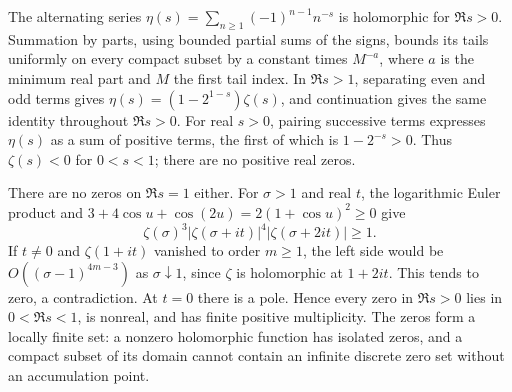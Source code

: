 The alternating series \(\eta(s)=\sum_{n\geq1}(-1)^{n-1}n^{-s}\) is
holomorphic for \(\Re s>0\). Summation by parts, using bounded partial
sums of the signs, bounds its tails uniformly on every compact subset
by a constant times \(M^{-a}\), where \(a\) is the minimum real part and
\(M\) the first tail index. In \(\Re s>1\), separating even and odd terms
gives \(\eta(s)=(1-2^{1-s})\zeta(s)\), and continuation gives the same
identity throughout \(\Re s>0\).
For real \(s>0\), pairing successive terms expresses \(\eta(s)\) as a
sum of positive terms, the first of which is \(1-2^{-s}>0\).
Thus \(\zeta(s)<0\) for \(0<s<1\); there are no positive real zeros.

There are no zeros on \(\Re s=1\) either. For \(\sigma>1\) and real \(t\),
the logarithmic Euler product and
\(3+4\cos u+\cos(2u)=2(1+\cos u)^2\geq0\) give
\[
 \zeta(\sigma)^3|\zeta(\sigma+it)|^4
 |\zeta(\sigma+2it)|\geq1.
\]
If \(t\ne0\) and \(\zeta(1+it)\) vanished to order \(m\geq1\), the left
side would be \(O((\sigma-1)^{4m-3})\) as \(\sigma\downarrow1\), since
\(\zeta\) is holomorphic at \(1+2it\). This tends to zero, a contradiction.
At \(t=0\) there is a pole. Hence every zero in \(\Re s>0\) lies in
\(0<\Re s<1\), is nonreal, and has finite positive multiplicity.
The zeros form a locally finite set: a nonzero holomorphic function has
isolated zeros, and a compact subset of its domain cannot contain an
infinite discrete zero set without an accumulation point.

